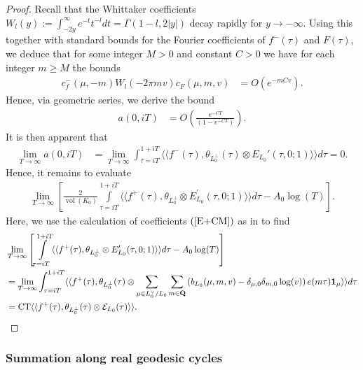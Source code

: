 \documentclass{amsart}
\theoremstyle{definition}
\theoremstyle{definition}
\theoremstyle{definition}
\begin{document}
\begin{proof}
Recall that the Whittaker coefficients $W_l(y):= \int_{-2y}^{\infty} e^{-t} t^{-l} dt = \Gamma(1-l, 2 \vert y \vert)$ decay rapidly for $y \rightarrow -\infty$.
Using this together with standard bounds for the Fourier coefficients of $f^-(\tau)$ and $F(\tau)$, 
we deduce that for some integer $M>0$ and constant $C>0$ we have for each integer $m \geq M$ the bounds 
\begin{align*} c_f^{-}(\mu, -m) W_l(- 2 \pi m v) c_F(\mu, m, v) &= O(e^{-m C v}). \end{align*}
Hence, via geometric series, we derive the bound 
\begin{align*} a(0, iT) &= O \left(  \frac{e^{-CT}}{ \left( 1 - e^{-CT} \right)  } \right). \end{align*}
It is then apparent that 
\begin{align*} \lim_{T \rightarrow \infty} a(0, iT) &= \lim_{T \rightarrow \infty} 
\int_{\tau = i T}^{1 + i T}\langle \langle f^-(\tau), \theta_{L_0^{\perp}}(\tau) \otimes E_{L_0}'(\tau, 0; 1) \rangle \rangle d \tau = 0. \end{align*}
Hence, it remains to evaluate
\begin{align*}\lim_{T \rightarrow \infty} \left[ \frac{2}{\operatorname{vol}(K_0) } 
\int\limits_{\tau = iT}^{1 + iT} \langle \langle f^+(\tau), \theta_{L_0^{\perp}} 
\otimes E_{L_0}^{\prime}(\tau, 0; 1) \rangle \rangle d \tau  - A_0 \log(T)  \right]. \end{align*}
Here, we use the calculation of coefficients $(\ref{E+CM})$ as in \cite[Theorem 4.7]{BY} to find
\begin{align*} &\lim_{T \rightarrow \infty} \left[ \int\limits_{\tau = iT}^{1 + iT} \langle \langle f^+(\tau), \theta_{L_0^{\perp}} 
\otimes E_{L_0}^{\prime}(\tau, 0; 1) \rangle \rangle d \tau  - A_0 \log(T) \right] \\
&= \lim_{T \rightarrow \infty} \int_{\tau = iT}^{1 + i T} \langle \langle f^+(\tau), \theta_{L_0^{\perp}}(\tau) \otimes
\sum\limits_{\mu \in L_0^{\vee}/L_0} \sum\limits_{m \in {\bf{Q}} } 
\left( b_{L_0}(\mu, m, v) - \delta_{\mu, 0} \delta_{m, 0} \log(v) \right) e(m\tau) {\bf{1}}_{\mu} \rangle \rangle d \tau \\
&= \operatorname{CT} \langle \langle f^+(\tau), \theta_{L_0^{\perp}}(\tau) \otimes \mathcal{E}_{L_0}(\tau) \rangle \rangle. \end{align*} \end{proof}

\subsubsection{Summation along real geodesic cycles}
\end{document}
